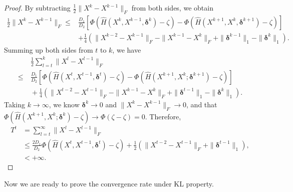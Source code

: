 \documentclass[twoside,11pt]{article}
\numberwithin{equation}{section}
\begin{document}
\begin{proof}
    By subtracting $\frac{1}{2}\|X^{k}-X^{k-1}\|_{F} $ from both sides, we obtain 
    \begin{equation}\begin{aligned}
      \frac{1}{2}\|X^{k}-X^{k-1}\|_{F} \le & \frac{D_{1}}{D_{2}}\left[\Phi \left(\hat{H} (X^{k},X^{k-1},\bm{\delta}^{k})-\zeta\right) - \Phi \left(\hat{H} (X^{k+1},X^{k},\bm{\delta}^{k+1})-\zeta\right)\right] \\
      & + \frac{1}{4} \left(\|X^{k-2}-X^{k-1}\|_{F} - \|X^{k-1}-X^{k}\|_{F} + \|\bm{\delta}^{k-1}\|_{1}-\|\bm{\delta}^{k}\|_{1}\right).
    \end{aligned}\end{equation} 
    Summing up both sides from $t$ to $k $, we have
    \begin{equation}\begin{aligned}
       &\ \frac{1}{2}\sum\limits_{l=t}^{k}\|X^l-X^{l-1}\|_{F}  \\
    \le&\ \frac{D_{1}}{D_{2}}\left[\Phi \left(\hat{H} (X^{t },X^{t -1},\bm{\delta}^{t })-\zeta\right) - \Phi \left(\hat{H} (X^{k+1},X^k;\bm{\delta}^{k+1})-\zeta\right)\right] \\
       &\ + \frac{1}{4} \left(\|X^{t -2}-X^{t -1}\|_{F} - \|X^{k -1}-X^k\|_{F} + \|\bm{\delta}^{t -1}\|_{1}-\|\bm{\delta}^{k}\|_{1}\right).
    \end{aligned}\end{equation}
    Taking $k\to\infty $, we know $\bm{\delta}^{k}\to0 $ and $\|X^{k}-X^{k-1}\|_{F}\to0 $, and that $\Phi \left(\hat{H} (X^{k+1},X^k;\bm{\delta}^k)-\zeta\right)\to\Phi (\zeta-\zeta)=0 $. 
    Therefore, 
    \begin{equation}\label{eq_upbound_accsum}
    \begin{aligned} 
      T^{t } & =\sum\limits_{l=t }^{\infty}\|X^l-X^{l-1}\|_{F} \\
      &\le  \frac{2D_{1}}{D_{2}}\Phi \left(\hat{H} (X^{t },X^{t -1},\bm{\delta}^{t })-\zeta\right) + \frac{1}{2} \left(\|X^{t -2}-X^{t -1}\|_{F} + \|\bm{\delta}^{t -1}\|_{1}\right), \\
      & < +\infty.
       \end{aligned}\end{equation}   
  \end{proof}
 
 
 
 Now we are ready to prove the convergence rate under KL property. 
\end{document}

